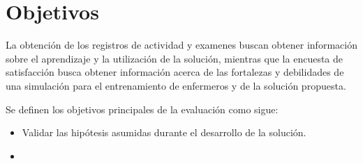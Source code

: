 \section{Objetivos}
\label{sec:objetivos}

La obtención de los registros de actividad y examenes buscan obtener información sobre el
aprendizaje y la utilización de la solución, mientras que la encuesta de
satisfacción busca obtener información acerca de las fortalezas y debilidades de
una simulación para el entrenamiento de enfermeros y de la solución propuesta.

Se definen los objetivos principales de la evaluación como sigue:

\begin{itemize}
\item Validar las hipótesis asumidas durante el desarrollo de la solución.
\item 
\end{itemize}


















